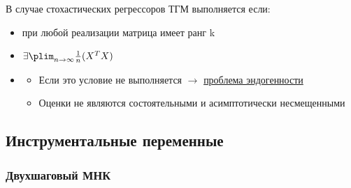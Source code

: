 \documentclass[a4paper, 12pt]{article}
\begin{document}
В случае стохастических регрессоров ТГМ выполняется если:

\begin{itemize}
    \item при любой реализации матрица имеет ранг k
    \item $\exists \plim_{n \to \infty} \frac{1}{n}(X^{T}X)$
    \item {}
    \begin{itemize}
        \item Если это условие не выполняется $\rightarrow$ \underline{проблема эндогенности}
        \item Оценки не являются состоятельными и асимптотически несмещенными
    \end{itemize}
\end{itemize}

\subsection{Инструментальные переменные}


\subsubsection{Двухшаговый МНК}
\end{document}

